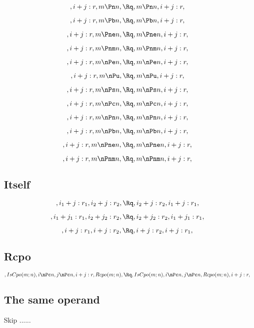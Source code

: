 \[, i+j:r, m \Pn n, \Rq , m \Pn n, i+j:r,\]

\[, i+j:r, m \Pb n, \Rq , m \Pb n, i+j:r,\]

\[, i+j:r, m \Pne n, \Rq , m \Pne n, i+j:r,\]

\[, i+j:r, m \Pnm n, \Rq , m \Pnm n, i+j:r,\]


\[, i+j:r, m \nPe n, \Rq , m \nPe n, i+j:r,\]

\[, i+j:r, m \nPu, \Rq , m \nPu, i+j:r,\]

\[, i+j:r, m \nPs n, \Rq , m \nPs n, i+j:r,\]

\[, i+j:r, m \nPc n, \Rq , m \nPc n, i+j:r,\]

\[, i+j:r, m \nPn n, \Rq , m \nPn n, i+j:r,\]

\[, i+j:r, m \nPb n, \Rq , m \nPb n, i+j:r,\]

\[, i+j:r, m \nPne n, \Rq , m \nPne n, i+j:r,\]

\[, i+j:r, m \nPnm n, \Rq , m \nPnm n, i+j:r,\]


\bigskip
\bigskip
\subsection{Itself}
\[, i_1+j:r_1, i_2+j:r_2, \Rq , i_2+j:r_2, i_1+j:r_1,\]

\[, i_1+j_1:r_1, i_2+j_2:r_2, \Rq , i_2+j_2:r_2, i_1+j_1:r_1,\]

\[, i+j:r_1, i+j:r_2, \Rq , i+j:r_2, i+j:r_1,\]

\bigskip
\bigskip
\subsection{Rcpo}
\[, IsCpo(m;n), i \nPc n, j \nPc n, i+j:r, Rcpo(m;n), \Rq , IsCpo(m;n), i \nPc n, j \nPc n, Rcpo(m;n), i+j:r,\]


\bigskip
\bigskip
\subsection{The same operand}
Skip ......


\bigskip
\bigskip
